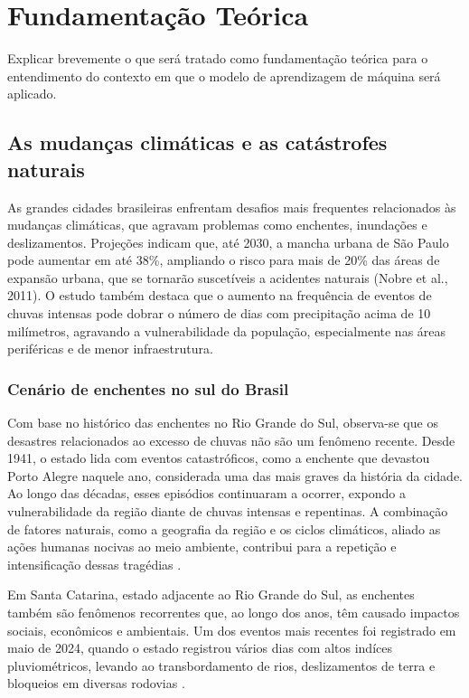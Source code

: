 \chapter{Fundamentação Teórica}\label{cap:fundamentacaoTeorica}
Explicar brevemente o que será tratado como fundamentação teórica para o entendimento do contexto em que o modelo de aprendizagem de máquina será aplicado.

\section{As mudanças climáticas e as catástrofes naturais}

As grandes cidades brasileiras enfrentam desafios mais frequentes relacionados às mudanças climáticas, que agravam problemas como enchentes, inundações e deslizamentos. Projeções indicam que, até 2030, a mancha urbana de São Paulo pode aumentar em até 38\%, ampliando o risco para mais de 20\% das áreas de expansão urbana, que se tornarão suscetíveis a acidentes naturais (Nobre et al., 2011). O estudo também destaca que o aumento na frequência de eventos de chuvas intensas pode dobrar o número de dias com precipitação acima de 10 milímetros, agravando a vulnerabilidade da população, especialmente nas áreas periféricas e de menor infraestrutura.

\subsection{Cenário de enchentes no sul do Brasil}

Com base no histórico das enchentes no Rio Grande do Sul, observa-se que os desastres relacionados ao excesso de chuvas não são um fenômeno recente. Desde 1941, o estado lida com eventos catastróficos, como a enchente que devastou Porto Alegre naquele ano, considerada uma das mais graves da história da cidade. Ao longo das décadas, esses episódios continuaram a ocorrer, expondo a vulnerabilidade da região diante de chuvas intensas e repentinas. A combinação de fatores naturais, como a geografia da região e os ciclos climáticos, aliado as ações humanas nocivas ao meio ambiente, contribui para a repetição e intensificação dessas tragédias \cite{veja2024}.

Em Santa Catarina, estado adjacente ao Rio Grande do Sul, as enchentes também são fenômenos recorrentes que, ao longo dos anos, têm causado impactos sociais, econômicos e ambientais. Um dos eventos mais recentes foi registrado em maio de 2024, quando o estado registrou vários dias com altos indíces pluviométricos, levando ao transbordamento de rios, deslizamentos de terra e bloqueios em diversas rodovias \cite{g12024}.

